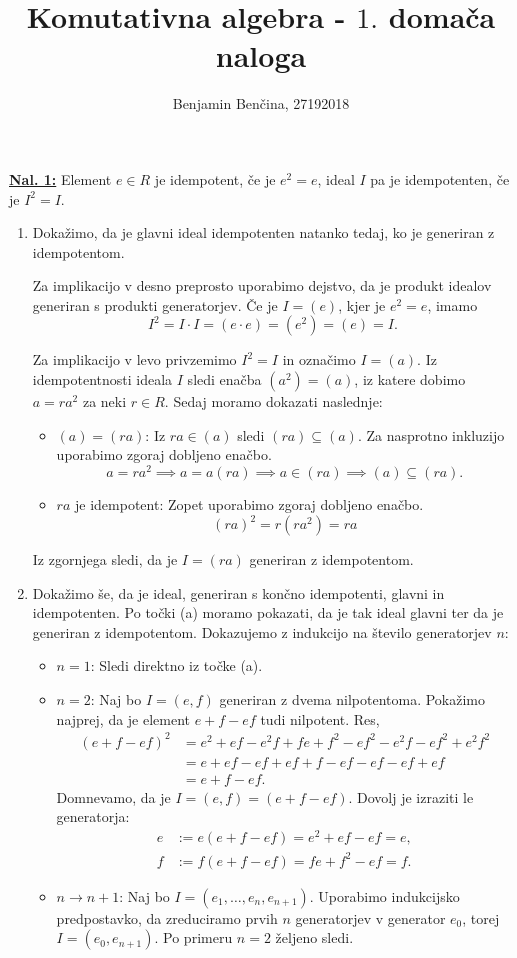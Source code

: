 \documentclass[a4paper, 12pt]{article} %
\title{Komutativna algebra - $1.$ domača naloga}
\author{Benjamin Benčina, 27192018}
\begin{document}
\maketitle

\underline{\textbf{Nal. 1:}}
Element $e \in R$ je idempotent, če je $e^2 = e$, ideal $I$ pa je idempotenten, če je $I^2=I$.

\begin{enumerate}[label=(\alph*)]
	\item Dokažimo, da je glavni ideal idempotenten natanko tedaj, ko je generiran z idempotentom.
	
	Za implikacijo v desno preprosto uporabimo dejstvo, da je produkt idealov generiran s produkti generatorjev. Če je $I = (e)$, kjer je $e^2 = e$, imamo \[I^2 = I\cdot I = (e\cdot e) = (e^2) = (e) = I.\]
	
	Za implikacijo v levo privzemimo $I^2 = I$ in označimo $I = (a)$. Iz idempotentnosti ideala $I$ sledi enačba $(a^2) = (a)$, iz katere dobimo $a = ra^2$ za neki $r \in R$. Sedaj moramo dokazati naslednje:
	\begin{itemize}
		\item $(a) = (ra)$: Iz $ra \in (a)$ sledi $(ra) \subseteq (a)$. Za nasprotno inkluzijo uporabimo zgoraj dobljeno enačbo.
		\[
		a = ra^2 \implies a = a(ra) \implies a \in (ra) \implies (a) \subseteq (ra).
		\]
		\item $ra$ je idempotent: Zopet uporabimo zgoraj dobljeno enačbo.
		\[
		(ra)^2 = r(ra^2) = ra
		\]
	\end{itemize}
	Iz zgornjega sledi, da je $I = (ra)$ generiran z idempotentom.
	\item Dokažimo še, da je ideal, generiran s končno idempotenti, glavni in idempotenten. Po točki (a) moramo pokazati, da je tak ideal glavni ter da je generiran z idempotentom. Dokazujemo z indukcijo na število generatorjev $n$:
	\begin{itemize}
		\item $n = 1$: Sledi direktno iz točke (a).
		\item $n = 2$: Naj bo $I = (e, f)$ generiran z dvema nilpotentoma.
		Pokažimo najprej, da je element $e + f - ef$ tudi nilpotent. Res,
		\begin{align*}
		(e+f-ef)^2 
		&= e^2 + ef - e^2f + fe + f^2 - ef^2 - e^2f - ef^2 + e^2f^2 \\
		&= e + ef - ef + ef + f - ef - ef - ef + ef \\ 
		&= e + f - ef.
		\end{align*}
		Domnevamo, da je $I = (e, f) = (e + f - ef)$. Dovolj je izraziti le generatorja:
		\begin{align*}
		e &:= e(e + f - ef) = e^2 + ef - ef = e, \\
		f &:= f(e + f - ef) = fe + f^2 - ef = f.
		\end{align*}
		\item $n \to n+1$: Naj bo $I = (e_1,\dots, e_n, e_{n+1})$. Uporabimo indukcijsko predpostavko, da zreduciramo prvih $n$ generatorjev v generator $e_0$, torej $I = (e_0, e_{n+1})$. Po primeru $n = 2$ željeno sledi.
	\end{itemize}
\end{enumerate}
\end{document}
